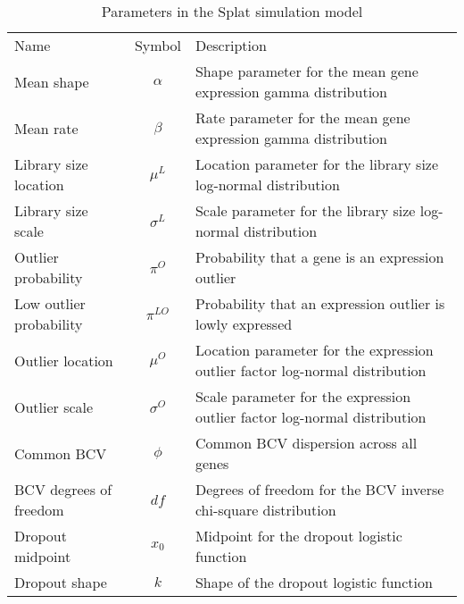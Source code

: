 \begin{table} 
    \begin{tabular}{ l c l }
        Name & Symbol & Description \\ 
        Mean shape & $\alpha$ & Shape parameter for the mean gene expression gamma distribution \\ 
        Mean rate & $\beta$ & Rate parameter for the mean gene expression gamma distribution \\ 
        Library size location & $\mu^{L}$ & Location parameter for the library size log-normal distribution \\ 
        Library size scale & $\sigma^{L}$ & Scale parameter for the library size log-normal distribution \\ 
        Outlier probability & $\pi^{O}$ & Probability that a gene is an expression outlier \\ 
        Low outlier probability & $\pi^{LO}$ & Probability that an expression outlier is lowly expressed \\ 
        Outlier location & $\mu^{O}$ & Location parameter for the expression outlier factor log-normal distribution \\ 
        Outlier scale & $\sigma^{O}$ & Scale parameter for the expression outlier factor log-normal distribution \\ 
        Common BCV & $\phi$ & Common BCV dispersion across all genes \\ 
        BCV degrees of freedom & $df$ & Degrees of freedom for the BCV inverse chi-square distribution \\ 
        Dropout midpoint & $x_0$ & Midpoint for the dropout logistic function \\
        Dropout shape & $k$ & Shape of the dropout logistic function \\
    \end{tabular} 
    \caption{Parameters in the Splat simulation model}
\end{table}